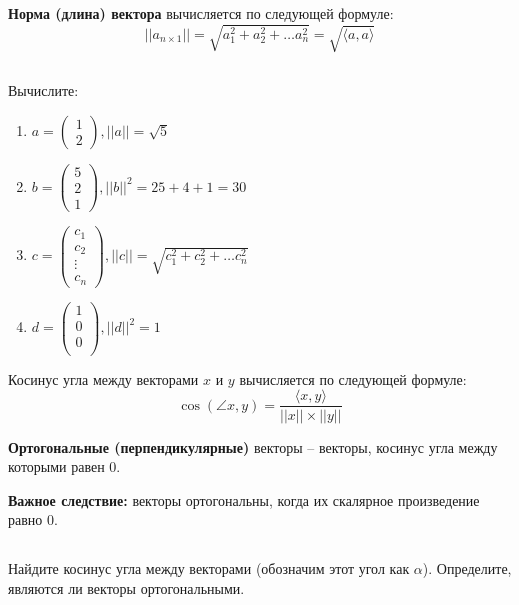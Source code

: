 \documentclass[11pt, a4paper]{extarticle}
\begin{document}
	\textbf{Норма (длина) вектора} вычисляется по следующей формуле:
	\[
	||a_{n\times1}|| = \sqrt{a_1^2 + a_2^2 + \ldots a_n^2} = \sqrt{\langle a,a\rangle}
	\]

	\subsection{}
	Вычислите:
	\begin{multicols}{2}
		\begin{enumerate}[label=\alph*)]
			\item $a = \begin{pmatrix}
			1 \\
			2
			\end{pmatrix}, ||a|| = \sqrt{5}$
			\item $b = \begin{pmatrix}
			5 \\
			2 \\ 
			1
			\end{pmatrix}, ||b||^2 = 25 + 4 + 1 = 30$
			\item $c = \begin{pmatrix}
			c_1 \\
			c_2 \\
			\vdots \\
			c_n
			\end{pmatrix}, ||c|| = \sqrt{c_1^2 + c_2^2 + \ldots c_n^2}$
			\item $d = \begin{pmatrix}
			1 \\
			0 \\
			0 \\
			\end{pmatrix}, ||d||^2 = 1$
		\end{enumerate}
	\end{multicols}
	
	Косинус угла между векторами $x$ и $y$ вычисляется по следующей формуле:
	\[
	\cos(\angle x, y) = \dfrac{\langle x, y\rangle}{||x||\times||y||}
	\] 
	
	\textbf{Ортогональные (перпендикулярные)} векторы – векторы, косинус угла между которыми равен 0.
	
	\textbf{Важное следствие:} векторы ортогональны, когда их скалярное произведение равно 0. 
	
	\subsection{}	
	Найдите косинус угла между векторами (обозначим этот угол как $\alpha$). Определите, являются ли векторы ортогональными. 
	
\end{document}
